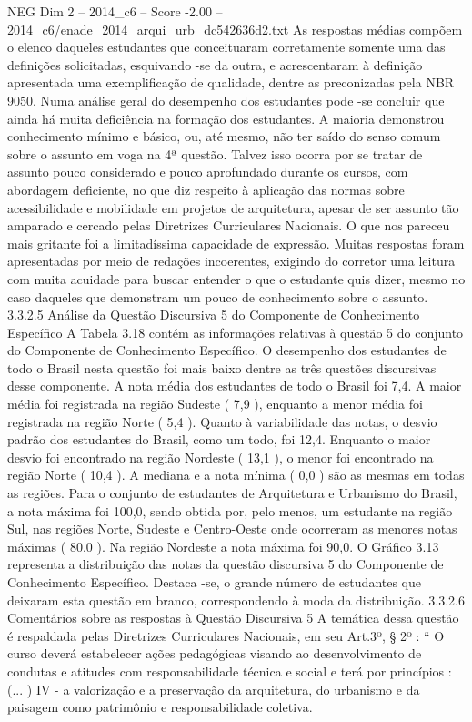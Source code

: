 \begin{textsample}{NEG Dim 2 – 2014\_c6 – Score -2.00 – 2014\_c6/enade\_2014\_arqui\_urb\_dc542636d2.txt}
As respostas médias compõem o elenco daqueles estudantes que conceituaram corretamente somente uma das definições solicitadas, esquivando -se da outra, e acrescentaram à definição apresentada uma exemplificação de qualidade, dentre as preconizadas pela NBR 9050.
Numa análise geral do desempenho dos estudantes pode -se concluir que ainda há muita deficiência na formação dos estudantes.
A maioria demonstrou conhecimento mínimo e básico, ou, até mesmo, não ter saído do senso comum sobre o assunto em voga na 4ª questão.
Talvez isso ocorra por se tratar de assunto pouco considerado e pouco aprofundado durante os cursos, com abordagem deficiente, no que diz respeito à aplicação das normas sobre acessibilidade e mobilidade em projetos de arquitetura, apesar de ser assunto tão amparado e cercado pelas Diretrizes Curriculares Nacionais.
O que nos pareceu mais gritante foi a limitadíssima capacidade de expressão.
Muitas respostas foram apresentadas por meio de redações incoerentes, exigindo do corretor uma leitura com muita acuidade para buscar entender o que o estudante quis dizer, mesmo no caso daqueles que demonstram um pouco de conhecimento sobre o assunto. 3.3.2.5 Análise da Questão Discursiva 5 do Componente de Conhecimento Específico A Tabela 3.18 contém as informações relativas à questão 5 do conjunto do Componente de Conhecimento Específico.
O desempenho dos estudantes de todo o Brasil nesta questão foi mais baixo dentre as três questões discursivas desse componente.
A nota média dos estudantes de todo o Brasil foi 7,4.
A maior média foi registrada na região Sudeste ( 7,9 ), enquanto a menor média foi registrada na região Norte ( 5,4 ).
Quanto à variabilidade das notas, o desvio padrão dos estudantes do Brasil, como um todo, foi 12,4.
Enquanto o maior desvio foi encontrado na região Nordeste ( 13,1 ), o menor foi encontrado na região Norte ( 10,4 ).
A mediana e a nota mínima ( 0,0 ) são as mesmas em todas as regiões.
Para o conjunto de estudantes de Arquitetura e Urbanismo do Brasil, a nota máxima foi 100,0, sendo obtida por, pelo menos, um estudante na região Sul, nas regiões Norte, Sudeste e Centro-Oeste onde ocorreram as menores notas máximas ( 80,0 ).
Na região Nordeste a nota máxima foi 90,0.
O Gráfico 3.13 representa a distribuição das notas da questão discursiva 5 do Componente de Conhecimento Específico.
Destaca -se, o grande número de estudantes que deixaram esta questão em branco, correspondendo à moda da distribuição. 3.3.2.6 Comentários sobre as respostas à Questão Discursiva 5 A temática dessa questão é respaldada pelas Diretrizes Curriculares Nacionais, em seu Art.3º, § 2º : “ O curso deverá estabelecer ações pedagógicas visando ao desenvolvimento de condutas e atitudes com responsabilidade técnica e social e terá por princípios : (... ) IV - a valorização e a preservação da arquitetura, do urbanismo e da paisagem como patrimônio e responsabilidade coletiva.

\end{textsample}
